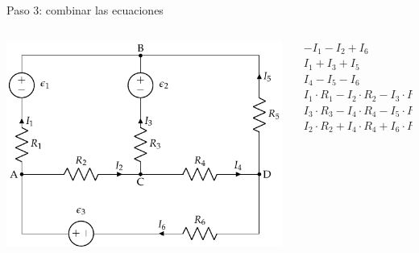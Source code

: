\documentclass[aspectratio=169, xcolor={usenames,svgnames,dvipsnames}]{beamer}
\begin{document}

\begin{frame}{Paso 3: \hspace{3mm}combinar las ecuaciones}
    \begin{columns}
    \begin{column}{0.5\columnwidth}
    \begin{center}
    \includegraphics[width=.9\linewidth]{../figs/mallas1.pdf}
    \end{center}
    \end{column}
    
    \begin{column}{0.5\columnwidth}
    \begin{align*}
      - I_1 -  I_2 + I_6  &= 0\\
      I_1 + I_3 + I_5 &= 0\\
      I_4 - I_5 - I_6 &= 0\\
      I_1 \cdot R_1 - I_2 \cdot R_2 - I_3 \cdot R_3 &= \epsilon_1 - \epsilon_2\\
      I_3 \cdot R_3 - I_4 \cdot R_4 -I_5 \cdot R_5 &= \epsilon_2\\
      I_2 \cdot R_2 + I_4 \cdot R_4 + I_6 \cdot R_6 &= \epsilon_3
    \end{align*}
    \end{column}
    \end{columns}
\end{frame}

\end{document}
